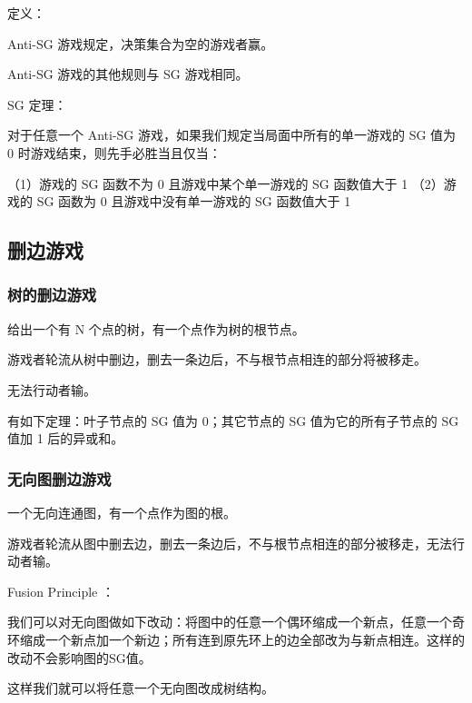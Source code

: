 定义：

Anti-SG 游戏规定，决策集合为空的游戏者赢。

Anti-SG 游戏的其他规则与 SG 游戏相同。

SG 定理：

对于任意一个 Anti-SG 游戏，如果我们规定当局面中所有的单一游戏的 SG 值为 0 时游戏结束，则先手必胜当且仅当：

（1）游戏的 SG 函数不为 0 且游戏中某个单一游戏的 SG 函数值大于 1
（2）游戏的 SG 函数为 0 且游戏中没有单一游戏的 SG 函数值大于 1

\subsection{删边游戏}

\subsubsection{树的删边游戏}

给出一个有 N 个点的树，有一个点作为树的根节点。

游戏者轮流从树中删边，删去一条边后，不与根节点相连的部分将被移走。

无法行动者输。

有如下定理：叶子节点的 SG 值为 0；其它节点的 SG 值为它的所有子节点的 SG 值加 1 后的异或和。

\subsubsection{无向图删边游戏}

一个无向连通图，有一个点作为图的根。

游戏者轮流从图中删去边，删去一条边后，不与根节点相连的部分被移走，无法行动者输。

Fusion Principle ：
       
我们可以对无向图做如下改动：将图中的任意一个偶环缩成一个新点，任意一个奇环缩成一个新点加一个新边；所有连到原先环上的边全部改为与新点相连。这样的改动不会影响图的SG值。

这样我们就可以将任意一个无向图改成树结构。
